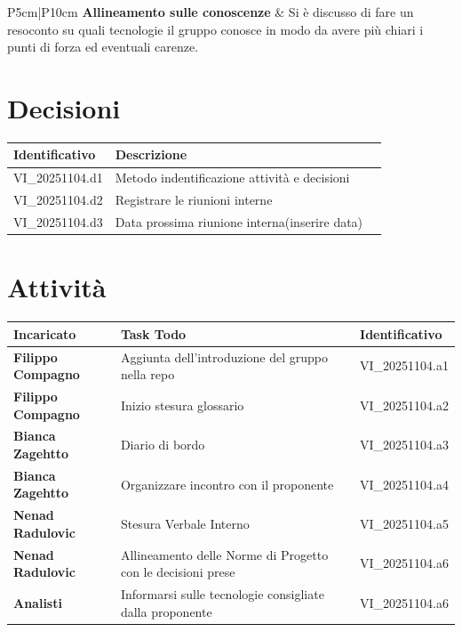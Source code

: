 \documentclass[a4paper,12pt]{article}
\begin{document}
\begin{longtable}{P{5cm}|P{10cm}}
    \textbf{Allineamento sulle conoscenze} & Si è discusso di fare un resoconto su quali tecnologie il gruppo conosce in modo da avere più chiari i punti di forza ed eventuali carenze. \\ 
\end{longtable}

\section{Decisioni}
\begin{tabularx}{\textwidth}{|l|X|l|}
    \hline
    \textbf{Identificativo} & \textbf{Descrizione}\\
    \hline
    VI\_20251104.d1 & Metodo indentificazione attività e decisioni\\
    \hline
    VI\_20251104.d2 & Registrare le riunioni interne\\
    \hline
    VI\_20251104.d3 & Data prossima riunione interna(inserire data) \\
    \hline
\end{tabularx}


\section{Attività}
\begin{tabularx}{\textwidth}{|l|X|l|}
    \hline
    \textbf{Incaricato} & \textbf{Task Todo} & \textbf{Identificativo} \\
    \hline
    \textbf{Filippo Compagno} & Aggiunta dell'introduzione del gruppo nella repo & VI\_20251104.a1\\
    \hline
    \textbf{Filippo Compagno} & Inizio stesura glossario & VI\_20251104.a2\\
    \hline
    \textbf{Bianca Zagehtto} & Diario di bordo & VI\_20251104.a3\\
    \hline
    \textbf{Bianca Zagehtto} & Organizzare incontro con il proponente & VI\_20251104.a4\\
    \hline
    \textbf{Nenad Radulovic} & Stesura Verbale Interno & VI\_20251104.a5\\
    \hline
    \textbf{Nenad Radulovic} & Allineamento delle Norme di Progetto con le decisioni prese & VI\_20251104.a6\\
    \hline
    \textbf{Analisti} & Informarsi sulle tecnologie consigliate dalla proponente & VI\_20251104.a6\\
    \hline

\end{tabularx}
\end{document}
